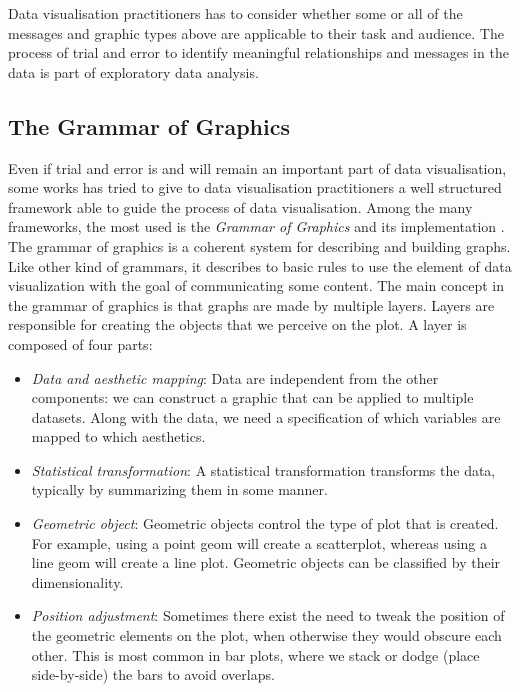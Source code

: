 \documentclass[b5paper,]{book}
\providecommand{\tightlist}{%
  \setlength{\itemsep}{0pt}\setlength{\parskip}{0pt}}
\theoremstyle{definition}
\theoremstyle{definition}
\theoremstyle{definition}
\theoremstyle{remark}
\begin{document}
Data visualisation practitioners has to consider whether some or all of
the messages and graphic types above are applicable to their task and
audience. The process of trial and error to identify meaningful
relationships and messages in the data is part of exploratory data
analysis.

\subsection{The Grammar of Graphics}\label{the-grammar-of-graphics}

Even if trial and error is and will remain an important part of data
visualisation, some works has tried to give to data visualisation
practitioners a well structured framework able to guide the process of
data visualisation. Among the many frameworks, the most used is the
\emph{Grammar of Graphics} \citep{wilkinson2006grammar} and its
implementation \citep{wickham2008ggplot2}. The grammar of graphics is a
coherent system for describing and building graphs. Like other kind of
grammars, it describes to basic rules to use the element of data
visualization with the goal of communicating some content. The main
concept in the grammar of graphics is that graphs are made by multiple
layers. Layers are responsible for creating the objects that we perceive
on the plot. A layer is composed of four parts:

\begin{itemize}
\tightlist
\item
  \emph{Data and aesthetic mapping}: Data are independent from the other
  components: we can construct a graphic that can be applied to multiple
  datasets. Along with the data, we need a specification of which
  variables are mapped to which aesthetics.
\item
  \emph{Statistical transformation}: A statistical transformation
  transforms the data, typically by summarizing them in some manner.
\item
  \emph{Geometric object}: Geometric objects control the type of plot
  that is created. For example, using a point geom will create a
  scatterplot, whereas using a line geom will create a line plot.
  Geometric objects can be classified by their dimensionality.
\item
  \emph{Position adjustment}: Sometimes there exist the need to tweak
  the position of the geometric elements on the plot, when otherwise
  they would obscure each other. This is most common in bar plots, where
  we stack or dodge (place side-by-side) the bars to avoid overlaps.
\end{itemize}
\end{document}
